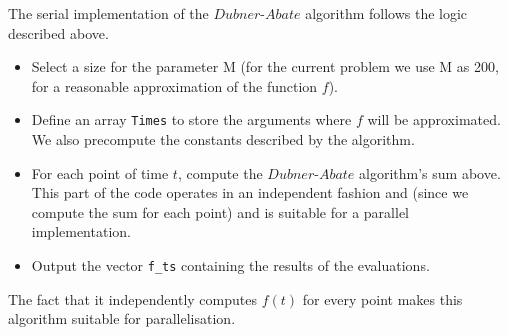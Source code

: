 The serial implementation of the $Dubner$-$Abate$ algorithm follows the logic described above.
\begin{itemize}
\item{Select a size for the parameter M (for the current problem we use M as 200, for a reasonable approximation of the function $f$).}
\item{Define an array \texttt{Times} to store the arguments where $f$ will be approximated. We also precompute the constants described by the algorithm.}
\item{For each point of time $t$, compute the $Dubner$-$Abate$ algorithm's sum above.
This part of the code operates in an independent fashion and (since we compute the sum for each point) and is suitable for a parallel implementation.}
\item{Output the vector \texttt{f\_ts} containing the results of the evaluations.}
\end{itemize}
The fact that it independently computes $f(t)$  for every point makes this algorithm suitable for parallelisation.

